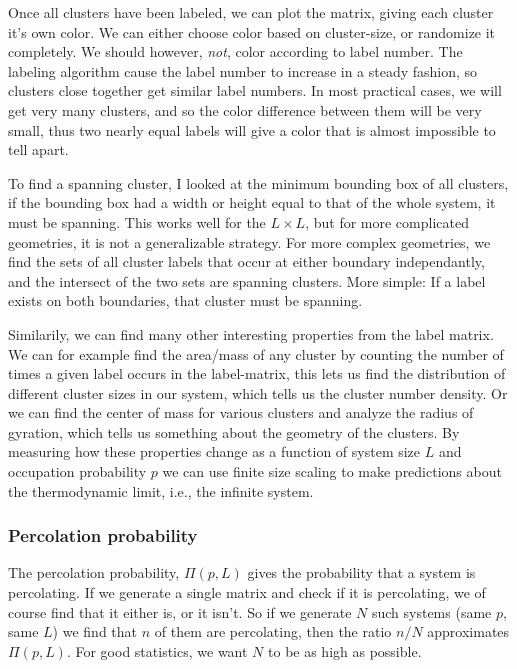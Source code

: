 \documentclass[a4paper, 11pt, notitlepage, english]{article}
\begin{document}
Once all clusters have been labeled, we can plot the matrix, giving each cluster it's own color. We can either choose color based on cluster-size, or randomize it completely. We should however, \emph{not}, color according to label number. The labeling algorithm cause the label number to increase in a steady fashion, so clusters close together get similar label numbers. In most practical cases, we will get very many clusters, and so the color difference between them will be very small, thus two nearly equal labels will give a color that is almost impossible to tell apart.

To find a spanning cluster, I looked at the minimum bounding box of all clusters, if the bounding box had a width or height equal to that of the whole system, it must be spanning. This works well for the $L\times L$, but for more complicated geometries, it is not a generalizable strategy. For more complex geometries, we find the sets of all cluster labels that occur at either boundary independantly, and the intersect of the two sets are spanning clusters. More simple: If a label exists on both boundaries, that cluster must be spanning. 

Similarily, we can find many other interesting properties from the label matrix. We can for example find the area/mass of any cluster by counting the number of times a given label occurs in the label-matrix, this lets us find the distribution of different cluster sizes in our system, which tells us the cluster number density. Or we can find the center of mass for various clusters and analyze the radius of gyration, which tells us something about the geometry of the clusters. By measuring how these properties change as a function of system size $L$ and occupation probability $p$ we can use finite size scaling to make predictions about the thermodynamic limit, i.e., the infinite system.

\subsubsection*{Percolation probability}

The percolation probability, $\Pi(p,L)$ gives the probability that a system is percolating. If we generate a single matrix and check if it is percolating, we of course find that it either is, or it isn't. So if we generate $N$ such systems (same $p$, same $L$) we find that $n$ of them are percolating, then the ratio $n/N$ approximates $\Pi(p,L)$. For good statistics, we want $N$ to be as high as possible. 
\end{document}
